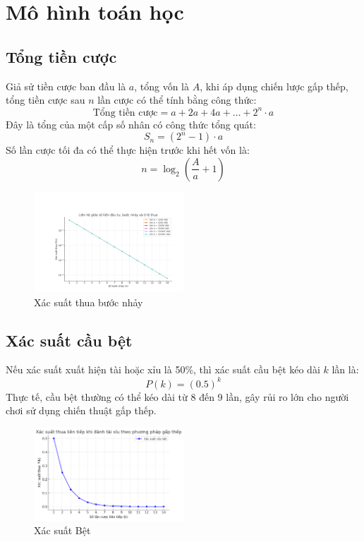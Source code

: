 \documentclass[a4paper,12pt]{article}
\begin{document}
\section{Mô hình toán học}

\subsection{Tổng tiền cược}
Giả sử tiền cược ban đầu là $a$, tổng vốn là $A$, khi áp dụng chiến lược gấp thếp, tổng tiền cược sau $n$ lần cược có thể tính bằng công thức:
\[
\text{Tổng tiền cược} = a + 2a + 4a + \ldots + 2^n \cdot a
\]
Đây là tổng của một cấp số nhân có công thức tổng quát:
\[
S_n = (2^n - 1) \cdot a
\]
Số lần cược tối đa có thể thực hiện trước khi hết vốn là:
\[
n = \log_2 \left(\frac{A}{a} + 1\right)
\]

\begin{figure}[h]
    \centering
    \includegraphics[width=0.5\textwidth]{xac_suat_thua.png}
    \caption{Xác suất thua bước nhảy}
\end{figure}

\subsection{Xác suất cầu bệt}
Nếu xác suất xuất hiện tài hoặc xỉu là 50\%, thì xác suất cầu bệt kéo dài $k$ lần là:
\[
P(k) = (0.5)^k
\]
Thực tế, cầu bệt thường có thể kéo dài từ 8 đến 9 lần, gây rủi ro lớn cho người chơi sử dụng chiến thuật gấp thếp.

\begin{figure}[h]
    \centering
    \includegraphics[width=0.5\textwidth]{xac_suat.png}
    \caption{Xác suất Bệt}
\end{figure}
\end{document}
